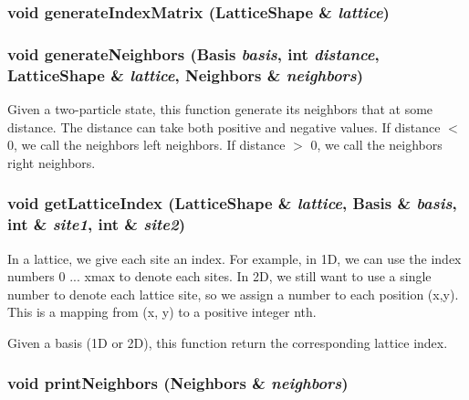 \subsubsection{\setlength{\rightskip}{0pt plus 5cm}void generate\-Index\-Matrix (\bf{Lattice\-Shape} \& {\em lattice})}\label{basis_8cpp_5104afb9f6ff60c6903d70feb9d37576}


\subsubsection{\setlength{\rightskip}{0pt plus 5cm}void generate\-Neighbors (\bf{Basis} {\em basis}, int {\em distance}, \bf{Lattice\-Shape} \& {\em lattice}, \bf{Neighbors} \& {\em neighbors})}\label{basis_8cpp_dc70ab0ee39f9e60d46e18d6c26e4156}


Given a two-particle state, this function generate its neighbors that at some distance. The distance can take both positive and negative values. If distance $<$ 0, we call the neighbors left neighbors. If distance $>$ 0, we call the neighbors right neighbors. 
\subsubsection{\setlength{\rightskip}{0pt plus 5cm}void get\-Lattice\-Index (\bf{Lattice\-Shape} \& {\em lattice}, \bf{Basis} \& {\em basis}, int \& {\em site1}, int \& {\em site2})}\label{basis_8cpp_c79dd08aec760821bccb305800cd4887}


In a lattice, we give each site an index. For example, in 1D, we can use the index numbers 0 ... xmax to denote each sites. In 2D, we still want to use a single number to denote each lattice site, so we assign a number to each position (x,y). This is a mapping from (x, y) to a positive integer nth.

Given a basis (1D or 2D), this function return the corresponding lattice index. 
\subsubsection{\setlength{\rightskip}{0pt plus 5cm}void print\-Neighbors (\bf{Neighbors} \& {\em neighbors})}\label{basis_8cpp_11e3efa510cb0e8f09015278644f1c0d}




